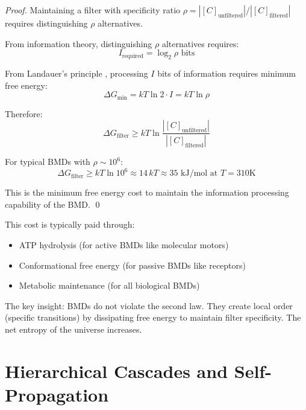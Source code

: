 \begin{proof}
Maintaining a filter with specificity ratio $\rho = |[C]_{\text{unfiltered}}|/|[C]_{\text{filtered}}|$ requires distinguishing $\rho$ alternatives.

From information theory, distinguishing $\rho$ alternatives requires:
\begin{equation}
I_{\text{required}} = \log_2 \rho \text{ bits}
\end{equation}

From Landauer's principle \cite{landauer1961irreversibility}, processing $I$ bits of information requires minimum free energy:
\begin{equation}
\Delta G_{\text{min}} = kT \ln 2 \cdot I = kT \ln \rho
\end{equation}

Therefore:
\begin{equation}
\Delta G_{\text{filter}} \geq kT \ln \frac{|[C]_{\text{unfiltered}}|}{|[C]_{\text{filtered}}|}
\end{equation}

For typical BMDs with $\rho \sim 10^6$:
\begin{equation}
\Delta G_{\text{filter}} \geq kT \ln 10^6 \approx 14 \, kT \approx 35 \text{ kJ/mol at } T = 310\text{K}
\end{equation}

This is the minimum free energy cost to maintain the information processing capability of the BMD. \qed
\end{proof}

\begin{remark}
This cost is typically paid through:
\begin{itemize}
\item ATP hydrolysis (for active BMDs like molecular motors)
\item Conformational free energy (for passive BMDs like receptors)
\item Metabolic maintenance (for all biological BMDs)
\end{itemize}

The key insight: BMDs do not violate the second law. They create local order (specific transitions) by dissipating free energy to maintain filter specificity. The net entropy of the universe increases.
\end{remark}

\section{Hierarchical Cascades and Self-Propagation}

